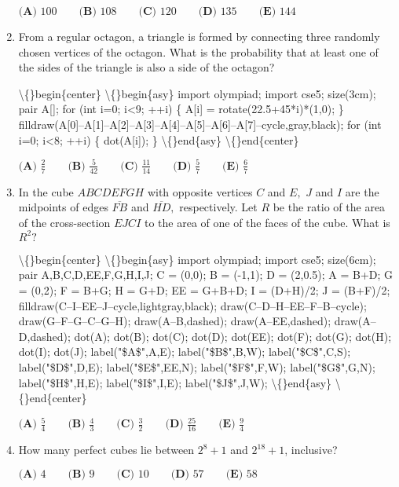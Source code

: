 \documentclass{article}
\begin{document}
\begin{enumerate}[label=\arabic*., itemsep=0.5em]
\(\textbf{(A) } 100 \qquad \textbf{(B) } 108 \qquad \textbf{(C) } 120 \qquad \textbf{(D) } 135 \qquad \textbf{(E) } 144\)\par \vspace{0.5em}\item From a regular octagon, a triangle is formed by connecting three randomly chosen vertices of the octagon. What is the probability that at least one of the sides of the triangle is also a side of the octagon?


\textbackslash\{\}begin\{center\}
\textbackslash\{\}begin\{asy\}
import olympiad;
import cse5;
size(3cm);
pair A[];
for (int i=0; i<9; ++i) \{
A[i] = rotate(22.5+45*i)*(1,0);
\}
filldraw(A[0]--A[1]--A[2]--A[3]--A[4]--A[5]--A[6]--A[7]--cycle,gray,black);
for (int i=0; i<8; ++i) \{ dot(A[i]); \}
\textbackslash\{\}end\{asy\}
\textbackslash\{\}end\{center\}


\(\textbf{(A) } \frac{2}{7} \qquad \textbf{(B) } \frac{5}{42} \qquad \textbf{(C) } \frac{11}{14} \qquad \textbf{(D) } \frac{5}{7} \qquad \textbf{(E) } \frac{6}{7}\)\par \vspace{0.5em}\item In the cube \(ABCDEFGH\) with opposite vertices \(C\) and \(E,\) \(J\) and \(I\) are the midpoints of edges \(\overline{FB}\) and \(\overline{HD},\) respectively. Let \(R\) be the ratio of the area of the cross-section \(EJCI\) to the area of one of the faces of the cube. What is \(R^2?\)


\textbackslash\{\}begin\{center\}
\textbackslash\{\}begin\{asy\}
import olympiad;
import cse5;
size(6cm);
pair A,B,C,D,EE,F,G,H,I,J;
C = (0,0);
B = (-1,1);
D = (2,0.5);
A = B+D;
G = (0,2);
F = B+G;
H = G+D;
EE = G+B+D;
I = (D+H)/2; J = (B+F)/2;
filldraw(C--I--EE--J--cycle,lightgray,black);
draw(C--D--H--EE--F--B--cycle); 
draw(G--F--G--C--G--H);
draw(A--B,dashed); draw(A--EE,dashed); draw(A--D,dashed);
dot(A); dot(B); dot(C); dot(D); dot(EE); dot(F); dot(G); dot(H); dot(I); dot(J);
label("\$A\$",A,E);
label("\$B\$",B,W);
label("\$C\$",C,S);
label("\$D\$",D,E);
label("\$E\$",EE,N);
label("\$F\$",F,W);
label("\$G\$",G,N);
label("\$H\$",H,E);
label("\$I\$",I,E);
label("\$J\$",J,W);
\textbackslash\{\}end\{asy\}
\textbackslash\{\}end\{center\}


\(\textbf{(A) } \frac{5}{4} \qquad \textbf{(B) } \frac{4}{3} \qquad \textbf{(C) } \frac{3}{2} \qquad \textbf{(D) } \frac{25}{16} \qquad \textbf{(E) } \frac{9}{4}\)\par \vspace{0.5em}\item How many perfect cubes lie between \(2^8+1\) and \(2^{18}+1\), inclusive?

\(\textbf{(A) }4\qquad\textbf{(B) }9\qquad\textbf{(C) }10\qquad\textbf{(D) }57\qquad \textbf{(E) }58\)\par \vspace{0.5em}\end{enumerate}
\end{document}
